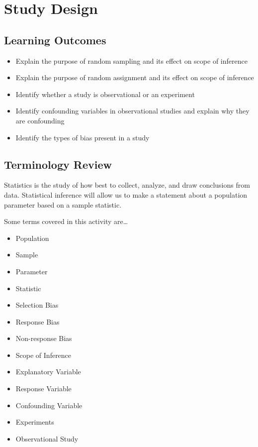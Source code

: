 \documentclass[
]{report}
\begin{document}
\hypertarget{study-design}{%
\chapter{Study Design}\label{study-design}}

\hypertarget{learning-outcomes}{%
\section{Learning Outcomes}\label{learning-outcomes}}

\begin{itemize}
\item
  Explain the purpose of random sampling and its effect on scope of inference
\item
  Explain the purpose of random assignment and its effect on scope of inference
\item
  Identify whether a study is observational or an experiment
\item
  Identify confounding variables in observational studies and explain why they are confounding
\item
  Identify the types of bias present in a study
\end{itemize}

\hypertarget{terminology-review}{%
\section{Terminology Review}\label{terminology-review}}

Statistics is the study of how best to collect, analyze, and draw conclusions from data. Statistical inference will allow us to make a statement about a population parameter based on a sample statistic.

Some terms covered in this activity are\ldots{}

\begin{itemize}
\item
  Population
\item
  Sample
\item
  Parameter
\item
  Statistic
\item
  Selection Bias
\item
  Response Bias
\item
  Non-response Bias
\item
  Scope of Inference
\item
  Explanatory Variable
\item
  Response Variable
\item
  Confounding Variable
\item
  Experiments
\item
  Observational Study
\end{itemize}
\end{document}
